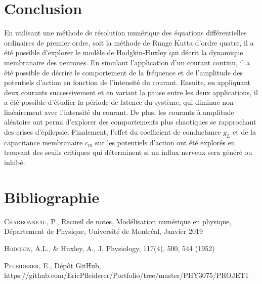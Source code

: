 \documentclass{article}
\begin{document}
\section{Conclusion}\label{sec:conclusion}

En utilisant une méthode de résolution numérique des équations différentielles ordinaires de premier ordre, soit la méthode de Runge Kutta d'ordre quatre, il a été possible d'explorer le modèle de Hodgkin-Huxley qui décrit la dynamique membranaire des neurones. En simulant l'application  d'un courant continu, il a été possible de décrire le comportement de la fréquence et de l'amplitude des potentiels d'action en fonction de l'intensité du courant. Ensuite, en appliquant deux courants successivement et en variant la pause entre les deux applications, il a été possible d'étudier la période de latence du système, qui diminue non linéairement avec l'intensité du courant. De plus, les courants à amplitude aléatoire ont permi d'explorer des comportements plus chaotiques se rapprochant des crises d'épilepsie. Finalement, l'effet du coefficient de conductance $g_L$ et de la capacitance membranaire $c_m$ sur les potentiels d'action ont été explorés en trouvant des seuils critiques qui déterminent si un influx nerveux sera généré ou inhibé. 

\pagebreak

\section{Bibliographie}\label{sec:bibliographie}
\begin{thebibliography}{l}
	\textsc{Charbonneau}, P., Recueil de notes, Modélisation numérique en physique, Département de Physique, Université de Montréal, Janvier 2019
	
	\textsc{Hodgkin}, A.L., \& Huxley, A., J. Physiology, 117(4), 500, 544 (1952)
	
	\textsc{Pfleiderer}, E., Dépôt GitHub, https://github.com/EricPfleiderer/Portfolio/tree/master/PHY3075/PROJET1
\end{thebibliography}

	
\end{document}
